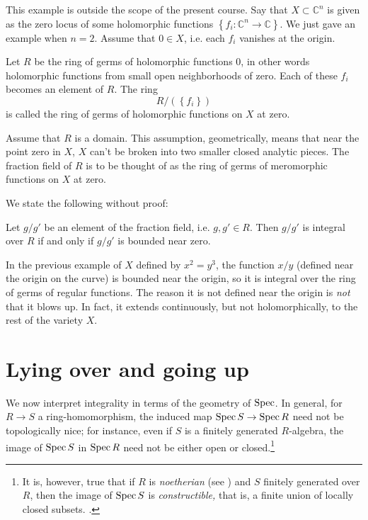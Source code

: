 \begin{example}
This example is outside the scope of the present course.  Say that $X \subset
\mathbb{C}^n$ is given as the zero locus of some holomorphic functions
$\left\{f_i: \mathbb{C}^{n} \to \mathbb{C}\right\}$.  We just gave an example
when $n=2$.
Assume that $0 \in X$, i.e. each $f_i$ vanishes at the origin.

Let $R$ be the ring of germs of holomorphic functions $0$, in other words
holomorphic functions from small open neighborhoods of zero.  Each of these
$f_i$ becomes an  element of $R$.  The ring
\[ R/(\left\{f_i\right\} ) \]
is called the ring of germs of holomorphic functions on $X$ at zero.

Assume that $R$ is a domain.  This assumption, geometrically, means that near
the point zero in $X$, $X$ can't be broken into two smaller closed analytic
pieces.  The fraction field of $R$ is to be thought of as the ring of
germs of meromorphic functions on $X$ at zero.

We state the following without proof:

\begin{theorem}
Let $g/g'$ be an element of the fraction field, i.e. $g, g' \in R$. Then $g/g'$
is integral over $R$ if and only if $g/g'$ is bounded near zero.
\end{theorem}

In the previous example of $X$ defined by $x^2 = y^3$, the function $x/y$
(defined near the origin on the curve) is
bounded near the origin, so it is integral over the ring of germs of regular
functions. The reason it is not defined near the origin is \emph{not} that it
blows up. In fact, it extends continuously, but not holomorphically, to the
rest of the variety $X$.
\end{example}

\section{Lying over and going up}
We now interpret integrality in terms of the geometry of $\operatorname{Spec}$.
In general, for $R \to S$ a ring-homomorphism, the induced map $\operatorname{Spec} S \to
\operatorname{Spec} R$ need not be topologically nice; for instance, even if $S$ is a
finitely generated $R$-algebra, the image of $\operatorname{Spec} S$ in $\operatorname{Spec} R$ need not
be either open or closed.\footnote{It is, however, true that if $R$ is
\emph{noetherian} (see ) and $S$ finitely generated over
$R$, then the image of $\operatorname{Spec} S$ is \emph{constructible,} that is, a finite
union of locally closed subsets. .}

